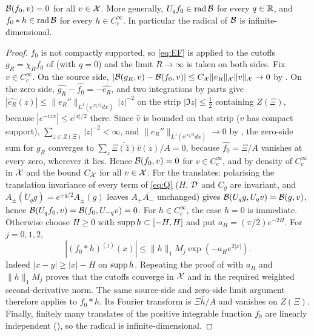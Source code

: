 \begin{proposition}\label{prop:radical}
$\mathcal B(f_0,v)=0$ for all $v\in\mathcal X$. More generally, $U_qf_0\in\operatorname{rad}\mathcal B$ for every $q\in\mathbb R$, and
$f_0*h\in\operatorname{rad}\mathcal B$ for every $h\in C_c^\infty$. In particular the radical of $\mathcal B$ is infinite-dimensional.
\end{proposition}
\begin{proof}
$f_0$ is not compactly supported, so \eqref{eq:EF} is applied to the cutoffs $g_R=\chi_Rf_0$ of  (with $q=0$) and the limit
$R\to\infty$ is taken on both sides. Fix $v\in C_c^\infty$. On the source side, $|\mathcal B(g_R,v)-\mathcal B(f_0,v)|\le C_{\mathcal X}\|e_R\|_{\mathcal X}\|v\|_{\mathcal X}\to0$
by . On the zero side, $\widehat{g_R}-\widehat{f_0}=-\widehat{e_R}$, and two integrations by parts give
$|\widehat{e_R}(z)|\le\|e_R''\|_{L^1(e^{|x|/2}dx)}\,|z|^{-2}$ on the strip $|\Im z|\le\tfrac12$ containing $Z(\Xi)$, because $|e^{-izx}|\le e^{|x|/2}$ there.
Since $\widehat v$ is bounded on that strip ($v$ has compact support), $\sum_{z\in Z(\Xi)}|z|^{-2}<\infty$, and $\|e_R''\|_{L^1(e^{|x|/2}dx)}\to0$
by , the zero-side sum for $g_R$ converges to $\sum_z\overline{\Xi(\bar z)}\widehat v(z)/A=0$, because $\widehat{f_0}=\Xi/A$
vanishes at every zero, wherever it lies. Hence $\mathcal B(f_0,v)=0$ for $v\in C_c^\infty$, and by density of $C_c^\infty$ in $\mathcal X$ and the bound
$C_{\mathcal X}$ for all $v\in\mathcal X$. For the translates: polarising the
translation invariance of every term of \eqref{eq:Q} ($H$, $\mathcal D$ and $C_g$ are invariant, and $A_\pm(U_qg)=e^{\pm q/2}A_\pm(g)$ leaves
$A_+\overline{A_-}$ unchanged) gives $\mathcal B(U_qg,U_qv)=\mathcal B(g,v)$, hence $\mathcal B(U_qf_0,v)=\mathcal B(f_0,U_{-q}v)=0$. For $h\in C_c^\infty$, the case $h=0$ is immediate. Otherwise choose
$H\ge0$ with $\operatorname{supp} h\subset[-H,H]$ and put
$a_H=(\pi/2)e^{-2H}$. For $j=0,1,2$,
\[
 |(f_0*h)^{(j)}(x)|
 \le\|h\|_1 M_j\exp(-a_He^{2|x|}).
\]
Indeed $|x-y|\ge|x|-H$ on $\operatorname{supp} h$. Repeating the proof of
 with $a_H$ and $\|h\|_1M_j$ proves that the
cutoffs converge in $\mathcal X$ and in the required weighted second-derivative
norm. The same source-side and zero-side limit argument therefore
applies to $f_0*h$. Its Fourier transform is $\Xi\widehat h/A$ and
vanishes on $Z(\Xi)$. Finally, finitely many translates of the
positive integrable function $f_0$ are linearly independent (), so the radical is infinite-dimensional.
\end{proof}

